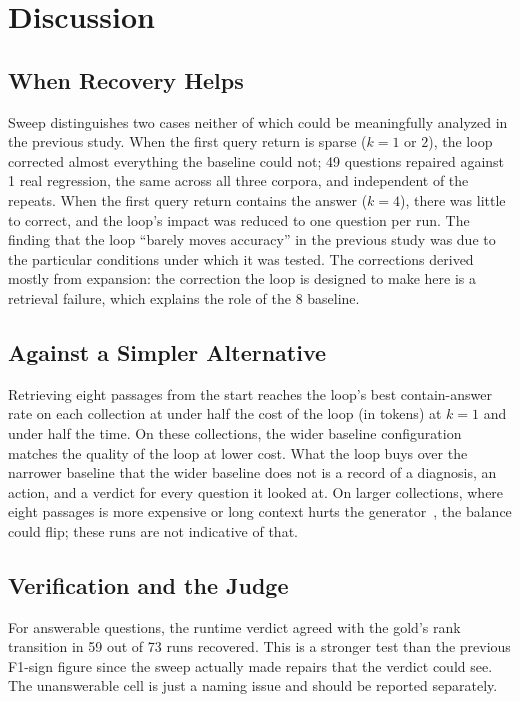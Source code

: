 \documentclass[12pt, a4paper, oneside]{report}
\begin{document}

\chapter{Discussion}
\label{discussion}

\section{When Recovery Helps}

Sweep distinguishes two cases neither of which could be meaningfully
analyzed in the previous study. When the first query return is sparse
($k=1$ or $2$), the loop corrected almost everything the baseline could not;
49 questions repaired against 1 real regression, the same across all three corpora, and
independent of the repeats. When the first query return contains the answer
($k=4$), there was little to correct, and the loop's impact was reduced to
one question per run. The finding that the loop ``barely moves accuracy'' in
the previous study was due to the particular conditions under which it was
tested. The corrections derived mostly from expansion: the correction the
loop is designed to make here is a retrieval failure, which explains the
role of the 8 baseline.

\section{Against a Simpler Alternative}

Retrieving eight passages from the start reaches the loop's best
contain-answer rate on each collection at under half the cost of the loop
(in tokens) at $k=1$ and under half the time. On these collections, the
wider baseline configuration matches the quality of the loop at lower cost.
What the loop buys over the narrower baseline that the wider baseline does
not is a record of a diagnosis, an action, and a verdict for every question
it looked at. On larger collections, where eight passages is more expensive
or long context hurts the generator~\cite{liu2024lost}, the balance could
flip; these runs are not indicative of that.

\section{Verification and the Judge}

For answerable questions, the runtime verdict agreed with the gold's rank
transition in 59 out of 73 runs recovered. This is a stronger test than the
previous F1-sign figure since the sweep actually made repairs that the
verdict could see. The unanswerable cell is just a naming issue and should
be reported separately.
\end{document}
